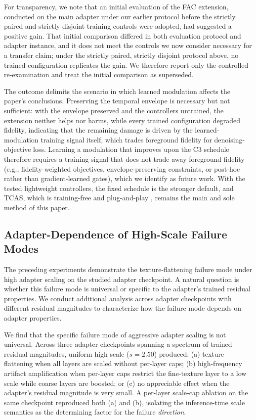 \documentclass[times,twocolumn,final]{elsarticle}
\providecommand{\DIFadd}[1]{{\protect\color{blue} \sf #1}} %
\providecommand{\DIFaddbegin}{} %
\providecommand{\DIFaddend}{} %
\newcommand{\DIFaddincludegraphics}[2][]{{\color{blue}\fbox{\DIFOincludegraphics[#1]{#2}}}} %
\DeclareRobustCommand{\DIFaddbegin}{\DIFOaddbegin \let\includegraphics\DIFaddincludegraphics} %
\DeclareRobustCommand{\DIFaddend}{\DIFOaddend \let\includegraphics\DIFOincludegraphics} %
\begin{document}
  \DIFaddbegin \DIFadd{For transparency, we note that an initial evaluation of the FAC extension, conducted on the main adapter under our earlier protocol before the strictly paired and strictly disjoint training controls were adopted, had suggested a positive gain. That initial comparison differed in both evaluation protocol and adapter instance, and it does not meet the controls we now consider necessary for a transfer claim; under the strictly paired, strictly disjoint protocol above, no trained configuration replicates the gain. We therefore report only the controlled re-examination and treat the initial comparison as superseded.
}\DIFaddend

  \DIFaddbegin \DIFadd{The outcome delimits the scenario in which learned modulation affects the paper's conclusions. Preserving the temporal envelope is necessary but not sufficient: with the envelope preserved and the controllers untrained, the extension neither helps nor harms, while every trained configuration degraded fidelity, indicating that the remaining damage is driven by the learned-modulation training signal itself, which trades foreground fidelity for denoising-objective loss. Learning a modulation that improves upon the C3 schedule therefore requires a training signal that does not trade away foreground fidelity (e.g., fidelity-weighted objectives, envelope-preserving constraints, or post-hoc rather than gradient-learned gates), which we identify as future work. With the tested lightweight controllers, the fixed schedule is the stronger default, and TCAS, which }\DIFaddend is training-free and plug-and-play  \DIFaddbegin \DIFadd{, remains the main and sole method of this paper}\DIFaddend .

\FloatBarrier

\subsection{Adapter-Dependence of High-Scale Failure Modes}
\label{subsec:adapterdep}

The preceding experiments demonstrate the texture-flattening failure mode under high adapter scaling on the studied adapter checkpoint. A natural question is whether this failure mode is universal or specific to the adapter's trained residual properties. We conduct additional analysis across adapter checkpoints with different residual magnitudes to characterize how the failure mode depends on adapter properties.

We find that the specific failure mode of aggressive adapter scaling is not universal. Across three adapter checkpoints spanning a spectrum of trained residual magnitudes, uniform high scale ($s = 2.50$) produced: (a) texture flattening when all layers are scaled without per-layer caps; (b) high-frequency artifact amplification when per-layer caps restrict the fine-texture layer to a low scale while coarse layers are boosted; or (c) no appreciable effect when the adapter's residual magnitude is very small. A per-layer scale-cap ablation on the same checkpoint reproduced both (a) and (b), isolating the inference-time scale semantics as the determining factor for the failure \emph{direction}.
\end{document}
